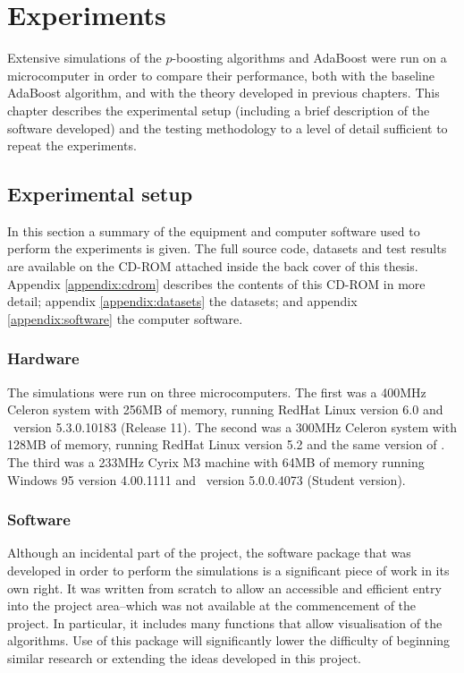 

\chapter{Experiments}
\label{chapter:method}

Extensive simulations of the $p$-boosting algorithms and AdaBoost were
run on a microcomputer in order to compare their performance, both
with the baseline AdaBoost algorithm, and with the theory developed in
previous chapters.  This chapter describes the experimental setup
(including a brief description of the software developed) and the
testing methodology to a level of detail sufficient to repeat the
experiments.

\section{Experimental setup}

In this section a summary of the equipment and computer software used
to perform the experiments is given.  The full source code, datasets
and test results are available on the CD-ROM attached inside the back
cover of this thesis.  Appendix \ref{appendix:cdrom} describes the
contents of this CD-ROM in more detail; appendix
\ref{appendix:datasets} the datasets; and appendix
\ref{appendix:software} the computer software.

\subsection{Hardware}

The simulations were run on three microcomputers.  The first was a
400MHz Celeron system with 256MB of memory, running RedHat Linux
version 6.0 and \MATLAB\ version 5.3.0.10183 (Release 11).  The second
was a 300MHz Celeron system with 128MB of memory, running RedHat Linux
version 5.2 and the same version of \MATLAB.  The third was a 233MHz
Cyrix M3 machine with 64MB of memory running Windows 95 version
4.00.1111 and \MATLAB\ version 5.0.0.4073 (Student version).

\subsection{Software}

Although an incidental part of the project, the software package that
was developed in order to perform the simulations is a significant
piece of work in its own right.  It was written from scratch to
allow an accessible and efficient entry into the project area--which
was not available at the commencement of the project.  In particular,
it includes many functions that allow visualisation of the algorithms.
Use of this package will significantly lower the difficulty of
beginning similar research or extending the ideas developed in this
project.

